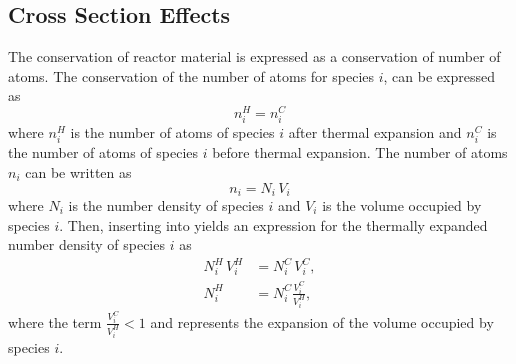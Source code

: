   \subsection{Cross Section Effects}
    \label{sec:cross_section_effects}
    The conservation of reactor material is expressed as a conservation of 
    number of atoms. The conservation of the number of atoms for species $i$, 
    can be expressed as
    \begin{equation}
      \label{eq:conservation}
      n_i^H = n_i^C 
    \end{equation}
    where $n_i^H$ is the number of atoms of species $i$ after thermal expansion
    and $n_i^C$ is the number of atoms of species $i$ before thermal expansion.
    The number of atoms $n_i$ can be written as 
    \begin{equation}
      \label{eq:nden_definition}
      n_i = N_i \, V_i
    \end{equation}
    where $N_i$ is the number density of species $i$ and $V_i$ is the volume
    occupied by species $i$. Then, inserting  into 
     yields an expression for the thermally expanded 
    number density of species $i$ as
    \begin{align}
      N_i^H \, V_i^H &= N_i^C \, V_i^C, \\
      \label{eq:nden_volume_ratio}
      N_i^H &= N_i^C \frac{V_i^C}{V_i^H},
    \end{align}
    where the term $\frac{V_i^C}{V_i^H} < 1$ and represents the expansion of the
    volume occupied by species $i$. 

